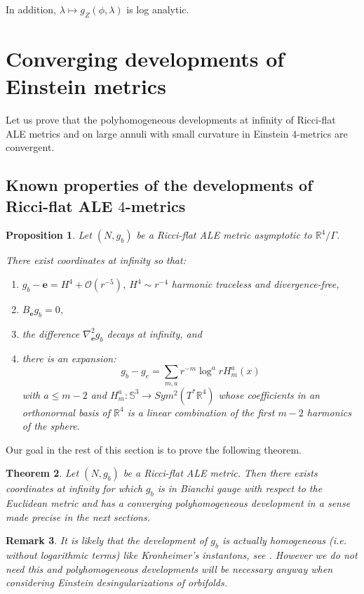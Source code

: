 \documentclass[12pt]{article}
\newtheorem{thm}{Theorem}[section]
\newtheorem{prop}[thm]{Proposition}
\newtheorem{rem}[thm]{Remark}
\begin{document}
In addition,
$\lambda \mapsto g_Z(\phi, \lambda)$ is log analytic.  

 
    \section{Converging developments of Einstein metrics}
    
    Let us prove that the polyhomogeneous developments at infinity of Ricci-flat ALE metrics and on large annuli with small curvature in Einstein $4$-metrics are convergent.
    
    \subsection{Known properties of the developments of Ricci-flat ALE $4$-metrics}
    
    \begin{prop}
     Let $(N,g_b)$ be a Ricci-flat ALE metric asymptotic to $\mathbb{R}^4\slash\Gamma$.
     
     There exist coordinates at infinity so that:
     \begin{enumerate}
         \item $g_b-\mathbf{e} = H^4 + \mathcal{O}(r^{-5})$, $H^4\sim r^{-4}$ harmonic traceless and divergence-free, 
         \item $B_\mathbf{e}g_b = 0$,
         \item the difference $\nabla_\mathbf{e}^2g_b$ decays at infinity, and
         \item there is an expansion:
     $$g_b-g_e = \sum_{m,a}r^{-m}\log^ar H_m^a(x)$$
     with $a\leqslant m-2$ and $H_m^a: \mathbb{S}^3\to Sym^2(T^*\mathbb{R}^4)$ whose coefficients in an orthonormal basis of $\mathbb{R}^4$ is a linear combination of the first $m-2$ harmonics of the sphere.
     \end{enumerate}
    \end{prop}
    
    Our goal in the rest of this section is to prove the following theorem.
    \begin{thm}
        Let $(N,g_b)$ be a Ricci-flat ALE metric. Then there exists coordinates at infinity for which $g_b$ is in Bianchi gauge with respect to the Euclidean metric and has a converging polyhomogeneous development in a sense made precise in the next sections.
    \end{thm}
    \begin{rem}
        It is likely that the development of $g_b$ is actually homogeneous (i.e. without logarithmic terms) like Kronheimer's instantons, see \cite[***]{kro}. However we do not need this and polyhomogeneous developments will be necessary anyway when considering Einstein desingularizations of orbifolds.
    \end{rem}
\end{document}
